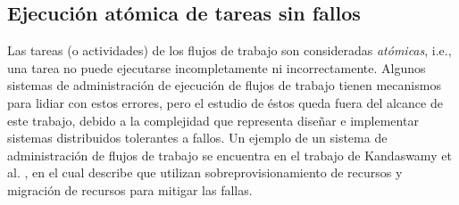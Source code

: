 \subsection{Ejecución atómica de tareas sin fallos}
Las tareas (o actividades) de los flujos de trabajo son consideradas \emph{atómicas}, i.e., una tarea no puede ejecutarse incompletamente ni incorrectamente. Algunos sistemas de administración de ejecución de flujos de trabajo tienen mecanismos para lidiar con estos errores, pero el estudio de éstos queda fuera del alcance de este trabajo, debido a la complejidad que representa diseñar e implementar sistemas distribuidos tolerantes a fallos. Un ejemplo de un sistema de administración de flujos de trabajo se encuentra en el trabajo de Kandaswamy et al. \cite{kandaswamy2008fault}, en el cual describe que utilizan sobreprovisionamiento de recursos y migración de recursos para mitigar las fallas.










